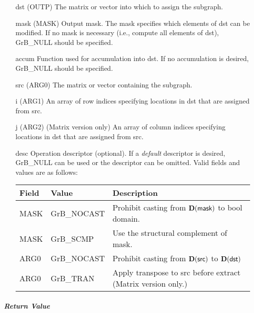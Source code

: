 \begin{itemize}[leftmargin=1.1in]
    \item[{\sf dst}]   ({\sf OUTP}) The matrix or vector into which to assign the subgraph.

    \item[{\sf mask}] ({\sf MASK}) Output mask. The mask specifies which elements
    of {\sf dst} can be modified. If no mask is necessary (i.e., compute all
    elements of {\sf dst}), {\sf GrB\_NULL} should be specified.

    \item[{\sf accum}] Function used for accumulation into {\sf dst}.  If no accumulation
                        is desired, {\sf GrB\_NULL} should be specified.

    \item[{\sf src}]   ({\sf ARG0}) The matrix or vector containing the subgraph.
    \item[{\sf i}]     ({\sf ARG1}) An array of row indices specifying locations in dst that
                       are assigned from src.
    \item[{\sf j}]     ({\sf ARG2}) (Matrix version only) An array of column indices 
                       specifying locations in dst that are assigned from src.


    \item[{\sf desc}]   Operation descriptor (optional). If a
    \emph{default} descriptor is desired, {\sf GrB\_NULL} can be
    used or the descriptor can be omitted.  Valid fields and values are as follows: \\
    \begin{tabular}{lll}
    Field  & Value & Description \\
    \hline
    {\sf MASK} & {\sf GrB\_NOCAST} & Prohibit casting from $\bold{D}({\sf mask})$ to {\sf bool} domain. \\
    {\sf MASK} & {\sf GrB\_SCMP} & Use the structural complement of {\sf mask}. \\
    {\sf ARG0} & {\sf GrB\_NOCAST} & Prohibit casting from $\bold{D}({\sf src})$ to $\bold{D}({\sf dst})$ \\
    {\sf ARG0} & {\sf GrB\_TRAN} & Apply transpose to {\sf src} before extract (Matrix version only.) \\
    \end{tabular}

\end{itemize}

\subparagraph{Return Value}

